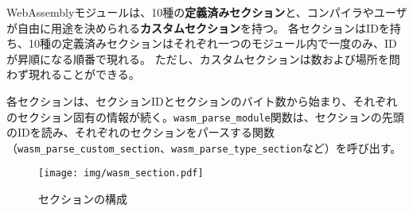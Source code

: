 WebAssemblyモジュールは、10種の{\bf 定義済みセクション}と、コンパイラやユーザが自由に用途を決められる{\bf カスタムセクション}を持つ。
各セクションはIDを持ち、10種の定義済みセクションはそれぞれ一つのモジュール内で一度のみ、IDが昇順になる順番で現れる。
ただし、カスタムセクションは数および場所を問わず現れることができる。



各セクションは、セクションIDとセクションのバイト数から始まり、それぞれのセクション固有の情報が続く。\verb|wasm_parse_module|関数は、セクションの先頭のIDを読み、それぞれのセクションをパースする関数（\verb|wasm_parse_custom_section|、\verb|wasm_parse_type_section|など）を呼び出す。


\begin{figure}[htbp]
  \caption{セクションの構成}
  \label{fig:wasm_section}
  \begin{center}
    \texttt{[image: img/wasm\_section.pdf]}
  \end{center}
\end{figure}

